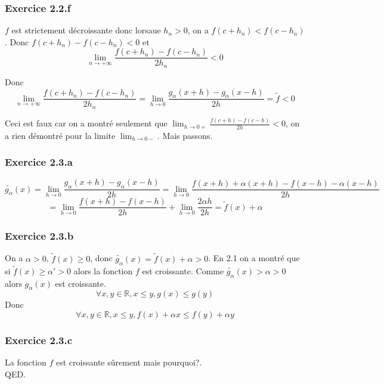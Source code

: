 \documentclass[]{book}
\theoremstyle{definition}
\newcommand{\bb}[1]{\mathbb{#1}}
\newcommand{\R}{\bb{R}}
\begin{document}
\subsubsection*{Exercice 2.2.f}
$f$ est strictement d\'ecroissante donc lorsaue $h_n > 0$, on a $f(c+h_n) < f(c-h_n)$. Donc $f(c+h_n)- f(c-h_n) < 0$ et 
$$\lim_{n \to +\infty} \frac{f(c+h_n)- f(c-h_n)}{2h_n} < 0$$

Donc
$$ \lim_{n \to +\infty} \frac{f(c+h_n)- f(c-h_n)}{2h_n} =
\lim_{h \to 0} \frac{g_\alpha(x+h)- g_\alpha(x-h)}{2h} = \tilde{f} < 0$$

Ceci est faux car on a montr\'e seulement que $\lim_{h \to 0+} \frac{f(c+h)- f(c-h)}{2h} < 0$, on a rien d\'emontr\'e pour la limite $\lim_{h \to 0-}$. Mais passons.

\subsubsection*{Exercice 2.3.a}
$$\tilde{g_\alpha}(x) = \lim_{h \to 0} \frac{g_\alpha(x+h)- g_\alpha(x-h)}{2h} = \lim_{h \to 0} \frac{f(x+h) + \alpha (x+h)  - f(x-h) - \alpha (x-h)}{2h}$$
$$=\lim_{h \to 0} \frac{f(x+h) - f(x-h)}{2h} + \lim_{h \to 0} \frac{2 \alpha h}{2h} = \tilde{f}(x) + \alpha$$

\subsubsection*{Exercice 2.3.b}
On a $\alpha > 0$, $\tilde{f}(x) \geq 0$, donc  $\tilde{g_\alpha}(x) = \tilde{f}(x) + \alpha > 0$. En 2.1 on a montr\'e que si $\tilde{f}(x) \geq \alpha' > 0$ alors la fonction $f$ est croissante. Comme $\tilde{g_\alpha}(x) > \alpha > 0$ alors $g_{\alpha}(x)$ est croissante. 
$$\forall x, y \in \R, x \leq y, g(x) \leq g(y)$$
Donc
$$\forall x, y \in \R, x \leq y, f(x) + \alpha x \leq f(y) + \alpha y$$

\subsubsection*{Exercice 2.3.c}

La fonction $f$ est croissante s\^urement mais pourquoi?.\\

QED.
\end{document}

